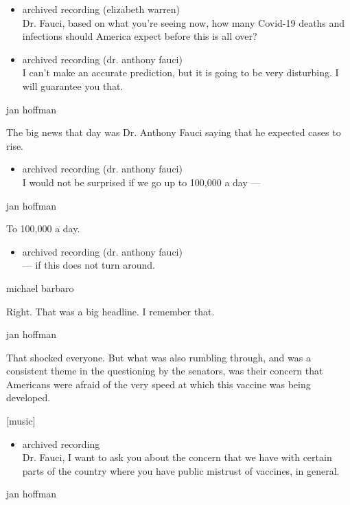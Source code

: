 \begin{itemize}
\item
  archived recording (elizabeth warren)\\
  Dr. Fauci, based on what you're seeing now, how many Covid-19 deaths
  and infections should America expect before this is all over?
\item
  archived recording (dr. anthony fauci)\\
  I can't make an accurate prediction, but it is going to be very
  disturbing. I will guarantee you that.
\end{itemize}

jan hoffman

The big news that day was Dr. Anthony Fauci saying that he expected
cases to rise.

\begin{itemize}
\tightlist
\item
  archived recording (dr. anthony fauci)\\
  I would not be surprised if we go up to 100,000 a day ---
\end{itemize}

jan hoffman

To 100,000 a day.

\begin{itemize}
\tightlist
\item
  archived recording (dr. anthony fauci)\\
  --- if this does not turn around.
\end{itemize}

michael barbaro

Right. That was a big headline. I remember that.

jan hoffman

That shocked everyone. But what was also rumbling through, and was a
consistent theme in the questioning by the senators, was their concern
that Americans were afraid of the very speed at which this vaccine was
being developed.

{[}music{]}

\begin{itemize}
\tightlist
\item
  archived recording\\
  Dr. Fauci, I want to ask you about the concern that we have with
  certain parts of the country where you have public mistrust of
  vaccines, in general.
\end{itemize}

jan hoffman

